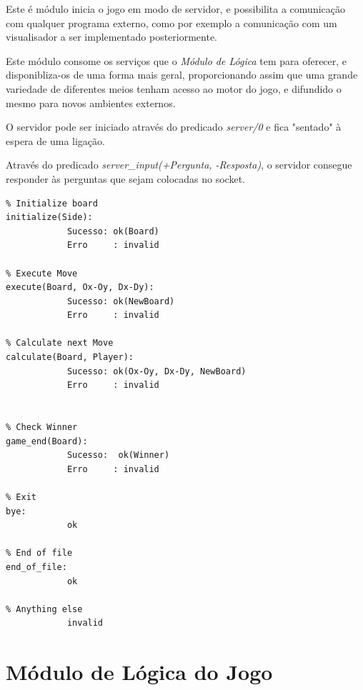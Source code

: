 \documentclass[15pt,a4paper]{article}
\begin{document}
Este é módulo inicia o jogo em modo de servidor, e possibilita a comunicação com qualquer programa externo, como por exemplo a
comunicação com um visualisador a ser implementado posteriormente.

Este módulo consome os serviços que o \textit{Módulo de Lógica} tem para oferecer, e disponibliza-os de uma forma mais geral, proporcionando
assim que uma grande variedade de diferentes meios tenham acesso ao motor do jogo, e difundido o mesmo para novos ambientes externos.

O servidor pode ser iniciado através do predicado \textit{server/0} e fica "sentado" à espera de uma ligação.

Através do predicado \textit{server\_input(+Pergunta, -Resposta)}, o servidor consegue responder às perguntas que sejam colocadas no socket.

\begin{lstlisting}
% Initialize board
initialize(Side):
			Sucesso: ok(Board)
			Erro	 : invalid

% Execute Move	
execute(Board, Ox-Oy, Dx-Dy):
			Sucesso: ok(NewBoard)
			Erro	 : invalid

% Calculate next Move
calculate(Board, Player):
			Sucesso: ok(Ox-Oy, Dx-Dy, NewBoard)
			Erro	 : invalid

	
% Check Winner
game_end(Board):
			Sucesso:  ok(Winner)
			Erro	 : invalid
 
% Exit
bye:
			ok

% End of file
end_of_file:
			ok

% Anything else
			invalid
\end{lstlisting}


\newpage

\section{Módulo de Lógica do Jogo}
\end{document}

